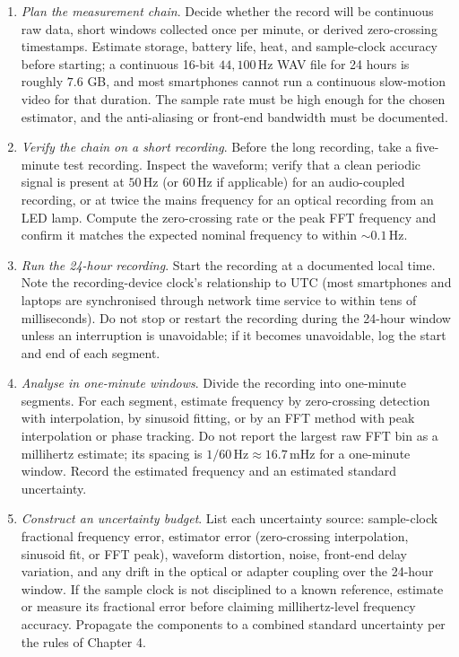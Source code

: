 \begin{project}
\begin{enumerate}[leftmargin=*]
  \item \emph{Plan the measurement chain}. Decide whether the
    record will be continuous raw data, short windows collected once
    per minute, or derived zero-crossing timestamps. Estimate
    storage, battery life, heat, and sample-clock accuracy before
    starting; a continuous 16-bit $44{,}100 \,\si{\hertz}$ WAV file
    for 24 hours is roughly $7.6$ GB, and most smartphones cannot
    run a continuous slow-motion video for that duration. The
    sample rate must be high enough for the chosen estimator, and
    the anti-aliasing or front-end bandwidth must be documented.

  \item \emph{Verify the chain on a short recording}. Before the
    long recording, take a five-minute test recording. Inspect the
    waveform; verify that a clean periodic signal is present at
    $50 \,\si{\hertz}$ (or $60 \,\si{\hertz}$ if applicable) for an
    audio-coupled recording, or at twice the mains frequency for an
    optical recording from an LED lamp. Compute the zero-crossing
    rate or the peak FFT frequency and confirm it matches the
    expected nominal frequency to within $\sim 0.1 \,\si{\hertz}$.

  \item \emph{Run the 24-hour recording}. Start the recording at a
    documented local time. Note the recording-device clock's
    relationship to UTC (most smartphones and laptops are
    synchronised through network time service to within tens of
    milliseconds). Do not stop or restart the recording during the
    24-hour window unless an interruption is unavoidable; if it
    becomes unavoidable, log the start and end of each segment.

  \item \emph{Analyse in one-minute windows}. Divide the recording
    into one-minute segments. For each segment, estimate frequency
    by zero-crossing detection with interpolation, by sinusoid
    fitting, or by an FFT method with peak interpolation or phase
    tracking. Do not report the largest raw FFT bin as a millihertz
    estimate; its spacing is $1/60 \,\si{\hertz} \approx 16.7 \,\si
    {\milli\hertz}$ for a one-minute window. Record the estimated
    frequency and an estimated standard uncertainty.

  \item \emph{Construct an uncertainty budget}. List each
    uncertainty source: sample-clock fractional frequency error,
    estimator error (zero-crossing interpolation, sinusoid fit, or
    FFT peak), waveform distortion, noise, front-end delay
    variation, and any drift in the optical or adapter coupling
    over the 24-hour window. If the sample clock is not disciplined
    to a known reference, estimate or measure its fractional error
    before claiming millihertz-level frequency accuracy. Propagate
    the components to a combined standard uncertainty per the
    rules of Chapter 4.


\end{enumerate}
\end{project}
